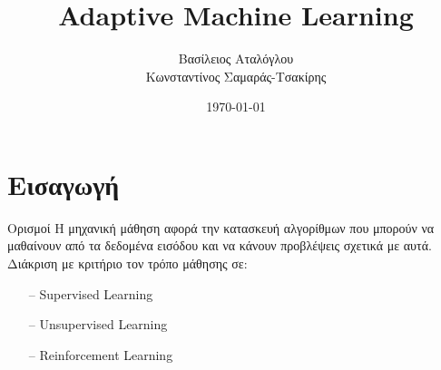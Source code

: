 \documentclass[11pt,center]{beamer}
\title{\huge{Adaptive Machine Learning}}
\author{Βασίλειος Αταλόγλου \\ Κωνσταντίνος Σαμαράς-Τσακίρης}
\date{\today}
\begin{document}
  \begin{frame}%
	  \titlepage
  \end{frame}

\section{Εισαγωγή}
  \begin{frame}{Ορισμοί}
	  Η μηχανική μάθηση αφορά την κατασκευή αλγορίθμων που μπορούν να μαθαίνουν από τα δεδομένα 				εισόδου και να κάνουν προβλέψεις σχετικά με αυτά.
	  \pause
	  \vfill
	  Διάκριση με κριτήριο τον τρόπο μάθησης σε:
		  \begin{itemize}
			  \item[--] Supervised Learning
			  \item[--] Unsupervised Learning
			  \item[--] Reinforcement Learning
		  \end{itemize}
  \end{frame}
\end{document}
